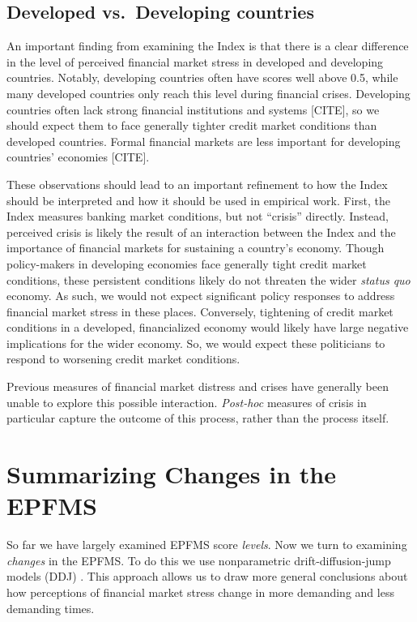\documentclass[]{article}
\begin{document}
\subsection{Developed vs.~Developing
countries}\label{developed-vs.developing-countries}

An important finding from examining the Index is that there is a clear
difference in the level of perceived financial market stress in
developed and developing countries. Notably, developing countries often
have scores well above 0.5, while many developed countries only reach
this level during financial crises. Developing countries often lack
strong financial institutions and systems {[}CITE{]}, so we should
expect them to face generally tighter credit market conditions than
developed countries. Formal financial markets are less important for
developing countries' economies {[}CITE{]}.

These observations should lead to an important refinement to how the
Index should be interpreted and how it should be used in empirical work.
First, the Index measures banking market conditions, but not ``crisis''
directly. Instead, perceived crisis is likely the result of an
interaction between the Index and the importance of financial markets
for sustaining a country's economy. Though policy-makers in developing
economies face generally tight credit market conditions, these
persistent conditions likely do not threaten the wider \emph{status quo}
economy. As such, we would not expect significant policy responses to
address financial market stress in these places. Conversely, tightening
of credit market conditions in a developed, financialized economy would
likely have large negative implications for the wider economy. So, we
would expect these politicians to respond to worsening credit market
conditions.

Previous measures of financial market distress and crises have generally
been unable to explore this possible interaction. \emph{Post-hoc}
measures of crisis in particular capture the outcome of this process,
rather than the process itself.

\section{Summarizing Changes in the EPFMS}

So far we have largely examined EPFMS score \emph{levels}. Now we turn to examining \emph{changes} in the EPFMS. To do this we use nonparametric drift-diffusion-jump models (DDJ) \citep{Carpenter2011,Dakos2012}. This approach allows us to draw more general conclusions about how perceptions of financial market stress change in more demanding and less demanding times.
\end{document}
